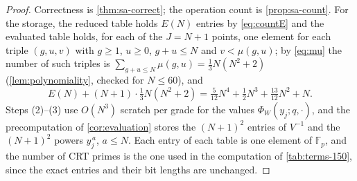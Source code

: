 \documentclass[11pt,reqno]{amsart}
\theoremstyle{definition}
\theoremstyle{remark}
\begin{document}
\begin{proof}
Correctness is \cref{thm:sa-correct}; the operation count is
\cref{prop:sa-count}.  For the storage, the reduced table holds $E(N)$
entries by \eqref{eq:countE} and the evaluated table holds, for each of the
$J=N+1$ points, one element for each triple $(g,u,v)$ with $g\geq1$,
$u\geq0$, $g+u\leq N$ and $v<\mu(g,u)$; by \eqref{eq:mu} the number of such
triples is $\sum_{g+u\leq N}\mu(g,u)=\frac13N(N^2+2)$
(\cref{lem:polynomiality}, checked for $N\leq60$), and
\[
 E(N)+(N+1)\cdot\tfrac13N(N^2+2)
 =\tfrac5{12}N^4+\tfrac12N^3+\tfrac{13}{12}N^2+N .
\]
Steps (2)--(3) use $O(N^3)$ scratch per grade for the values
$\Phi_W(y_j;q,\cdot)$, and the precomputation of \cref{cor:evaluation}
stores the $(N+1)^2$ entries of $V^{-1}$ and the $(N+1)^2$ powers
$y_j^{\,a}$, $a\leq N$.  Each entry of each table is
one element of $\mathbb F_p$, and the number of CRT primes is the one used
in the computation of \cref{tab:terms-150}, since the exact entries and their bit lengths are
unchanged.
\end{proof}
\end{document}

